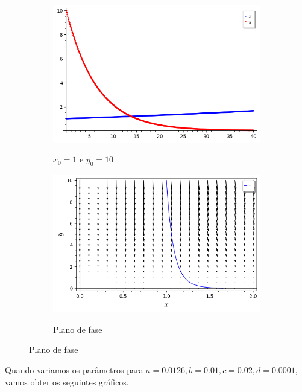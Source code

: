 \begin{figure}[H]
    \centering
    \begin{subfigure}{0.4\textwidth}
        \includegraphics[scale=0.48]{figuras/LV_3.png}
        \label{fig:LV_3}
        \caption{$x_0 = 1$ e $y_0 = 10$}
    \end{subfigure}
    \begin{subfigure}{0.4\textwidth}
        \includegraphics[scale=0.48]{figuras/LV_6.png}
        \label{fig:LV_6}
        \caption{Plano de fase}
    \end{subfigure}
\end{figure}

Quando variamos os parâmetros para $a = 0.0126, b = 0.01, c = 0.02, d = 0.0001$, vamos obter os seguintes gráficos.

